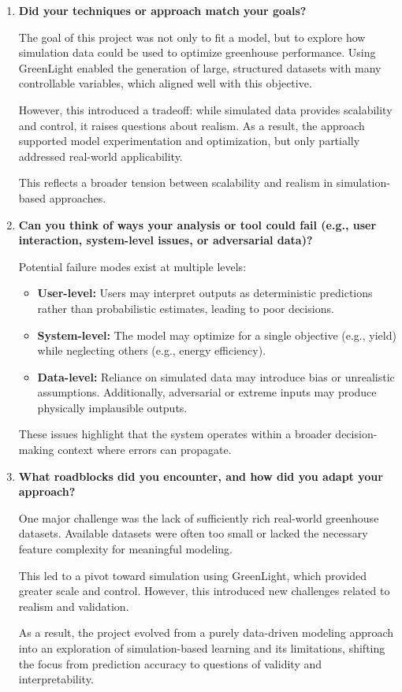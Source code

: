 \documentclass{article}
\begin{document}
\begin{enumerate}
    A strong simulation is not only accurate, but also consistent, robust, and interpretable.

    \item \textbf{Did your techniques or approach match your goals?}

    The goal of this project was not only to fit a model, but to explore how simulation data could be used to optimize greenhouse performance. Using GreenLight enabled the generation of large, structured datasets with many controllable variables, which aligned well with this objective.

    However, this introduced a tradeoff: while simulated data provides scalability and control, it raises questions about realism. As a result, the approach supported model experimentation and optimization, but only partially addressed real-world applicability.

    This reflects a broader tension between scalability and realism in simulation-based approaches.

    \item \textbf{Can you think of ways your analysis or tool could fail (e.g., user interaction, system-level issues, or adversarial data)?}

    Potential failure modes exist at multiple levels:

    \begin{itemize}
        \item \textbf{User-level:} Users may interpret outputs as deterministic predictions rather than probabilistic estimates, leading to poor decisions.
        \item \textbf{System-level:} The model may optimize for a single objective (e.g., yield) while neglecting others (e.g., energy efficiency).
        \item \textbf{Data-level:} Reliance on simulated data may introduce bias or unrealistic assumptions. Additionally, adversarial or extreme inputs may produce physically implausible outputs.
    \end{itemize}

    These issues highlight that the system operates within a broader decision-making context where errors can propagate.

    \item \textbf{What roadblocks did you encounter, and how did you adapt your approach?}

    One major challenge was the lack of sufficiently rich real-world greenhouse datasets. Available datasets were often too small or lacked the necessary feature complexity for meaningful modeling.

    This led to a pivot toward simulation using GreenLight, which provided greater scale and control. However, this introduced new challenges related to realism and validation.

    As a result, the project evolved from a purely data-driven modeling approach into an exploration of simulation-based learning and its limitations, shifting the focus from prediction accuracy to questions of validity and interpretability.

\end{enumerate}
\end{document}
